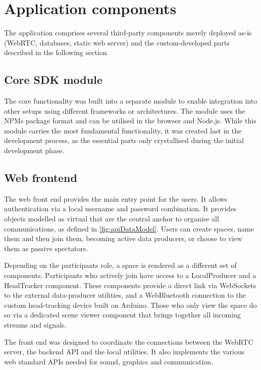 \section{Application components}
\label{sec:application-components}

The application comprises several third-party components merely deployed as-is (WebRTC, databases, static web server) and the custom-developed parts described in the following section.

\subsection{Core SDK module}
\label{subsec:core-sdk-module}

The core functionality was built into a separate module to enable integration into other setups using different frameworks or architectures.
The module uses the \ac{NPM}\textquotesingle s package format and can be utilised in the browser and Node.js.
While this module carries the most fundamental functionality, it was created last in the development process, as the essential parts only crystallised during the initial development phase.

\subsection{Web frontend}
\label{subsec:web-frontend}

The web front end provides the main entry point for the users.
It allows authentication via a local username and password combination.
It provides objects modelled as virtual  that are the central anchor to organise all communications, as defined in \autoref{fig:apiDataModel}.
Users can create spaces, name them and then join them, becoming active data producers, or choose to view them as passive spectators.

Depending on the participant\textquotesingle s role, a space is rendered as a different set of components.
Participants who actively join have access to a LocalProducer and a HeadTracker component.
These components provide a direct link via WebSockets to the external data-producer utilities, and a WebBluetooth connection to the custom head-tracking device built on Arduino.
Those who only view the space do so via a dedicated scene viewer component that brings together all incoming streams and signals.

The front end was designed to coordinate the connections between the WebRTC server, the backend \ac{API} and the local utilities.
It also implements the various web standard \ac{API}s needed for sound, graphics and communication.

